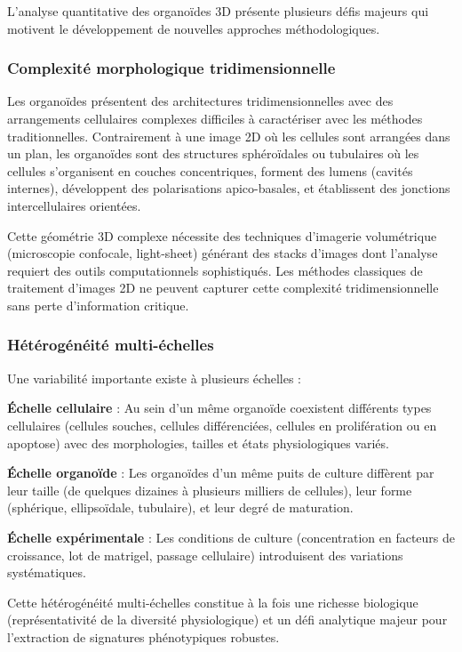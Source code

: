 L'analyse quantitative des organoïdes 3D présente plusieurs défis majeurs qui motivent le développement de nouvelles approches méthodologiques.

\subsubsection{Complexité morphologique tridimensionnelle}

Les organoïdes présentent des architectures tridimensionnelles avec des arrangements cellulaires complexes difficiles à caractériser avec les méthodes traditionnelles. Contrairement à une image 2D où les cellules sont arrangées dans un plan, les organoïdes sont des structures sphéroïdales ou tubulaires où les cellules s'organisent en couches concentriques, forment des lumens (cavités internes), développent des polarisations apico-basales, et établissent des jonctions intercellulaires orientées.

Cette géométrie 3D complexe nécessite des techniques d'imagerie volumétrique (microscopie confocale, light-sheet) générant des stacks d'images dont l'analyse requiert des outils computationnels sophistiqués. Les méthodes classiques de traitement d'images 2D ne peuvent capturer cette complexité tridimensionnelle sans perte d'information critique.

\subsubsection{Hétérogénéité multi-échelles}

Une variabilité importante existe à plusieurs échelles :

\textbf{Échelle cellulaire} : Au sein d'un même organoïde coexistent différents types cellulaires (cellules souches, cellules différenciées, cellules en prolifération ou en apoptose) avec des morphologies, tailles et états physiologiques variés.

\textbf{Échelle organoïde} : Les organoïdes d'un même puits de culture diffèrent par leur taille (de quelques dizaines à plusieurs milliers de cellules), leur forme (sphérique, ellipsoïdale, tubulaire), et leur degré de maturation.

\textbf{Échelle expérimentale} : Les conditions de culture (concentration en facteurs de croissance, lot de matrigel, passage cellulaire) introduisent des variations systématiques.

Cette hétérogénéité multi-échelles constitue à la fois une richesse biologique (représentativité de la diversité physiologique) et un défi analytique majeur pour l'extraction de signatures phénotypiques robustes.

